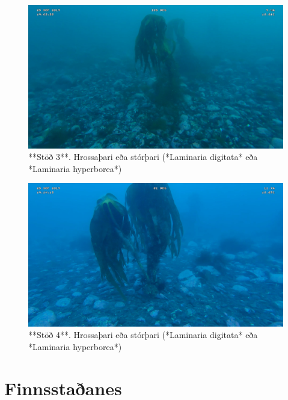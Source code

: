 \documentclass[icelandic,]{book}
\begin{document}
\begin{figure}

{\centering \includegraphics[width=1\linewidth]{skjol/skogar/sk6/stodvar/st4/sk6-st4} 

}

\caption{**Stöð 3**. Hrossaþari eða stórþari (*Laminaria digitata* eða *Laminaria hyperborea*)}\label{fig:mynd-sk-sex-stod-fjogur}
\end{figure}

\begin{figure}

{\centering \includegraphics[width=1\linewidth]{skjol/skogar/sk6/stodvar/st5/sk6-st5} 

}

\caption{**Stöð 4**. Hrossaþari eða stórþari (*Laminaria digitata* eða *Laminaria hyperborea*)}\label{fig:mynd-sk-sex-stod-fimm}
\end{figure}

\hypertarget{finnsstaanes}{%
\chapter*{Finnsstaðanes}\label{finnsstaanes}}
\end{document}

